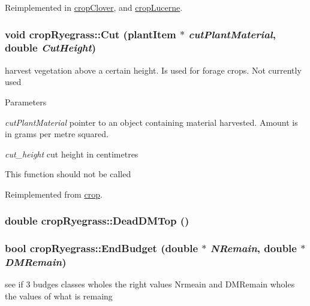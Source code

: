 Reimplemented in \hyperlink{classcrop_clover_afe134102e033bd1326eb955327b4d902}{cropClover}, and \hyperlink{classcrop_lucerne_a5060448bb250b985ad156fb25b368daa}{cropLucerne}.\hypertarget{classcrop_ryegrass_a35e69a6dea6f87f1adb3060e456290ba}{
\subsubsection[{Cut}]{\setlength{\rightskip}{0pt plus 5cm}void cropRyegrass::Cut ({\bf plantItem} $\ast$ {\em cutPlantMaterial}, \/  double {\em CutHeight})}}
\label{classcrop_ryegrass_a35e69a6dea6f87f1adb3060e456290ba}


harvest vegetation above a certain height. Is used for forage crops. Not currently used 
\begin{DoxyParams}{Parameters}
\item[{\em cutPlantMaterial}]pointer to an object containing material harvested. Amount is in grams per metre squared. \item[{\em cut\_\-height}]cut height in centimetres\end{DoxyParams}
This function should not be called 

Reimplemented from \hyperlink{classcrop_a5b2a6a3522c64790e295055ff164dc10}{crop}.\hypertarget{classcrop_ryegrass_aebf12683e5eb4d3a672808a2e3ab147c}{
\subsubsection[{DeadDMTop}]{\setlength{\rightskip}{0pt plus 5cm}double cropRyegrass::DeadDMTop ()}}
\label{classcrop_ryegrass_aebf12683e5eb4d3a672808a2e3ab147c}
\hypertarget{classcrop_ryegrass_a5bb3f7b2ad5805e527bea21bbb71531c}{
\subsubsection[{EndBudget}]{\setlength{\rightskip}{0pt plus 5cm}bool cropRyegrass::EndBudget (double $\ast$ {\em NRemain}, \/  double $\ast$ {\em DMRemain})}}
\label{classcrop_ryegrass_a5bb3f7b2ad5805e527bea21bbb71531c}
see if 3 budges classes wholes the right values Nrmeain and DMRemain wholes the values of what is remaing 

